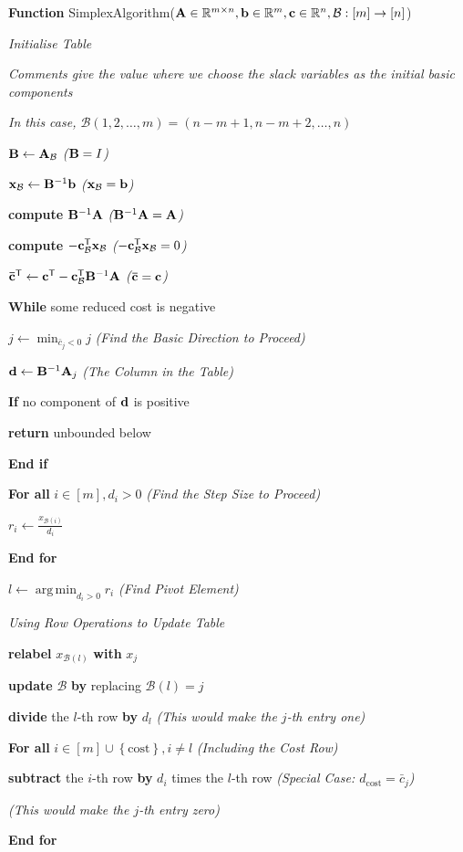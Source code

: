 \documentclass[11pt]{article}
\theoremstyle{definition}
\theoremstyle{remark}
\newcommand{\pqty}[1]{\left(#1\right)}
\newcommand{\bqty}[1]{\left[#1\right]}
\newcommand{\Bqty}[1]{\left\{#1\right\}}
\newcommand{\flatfrac}[2]{\frac{#1}{#2}}
\newcommand{\functiondomain}[3]{#1:#2\to #3}
\newcommand{\RR}{\mathbb{R}}
\newcommand{\transpose}{^{\mathsf{T}}}
\newcommand{\inverse}{^{-1}}
\newcommand{\identityM}{I}
\DeclareMathOperator*{\argmin}{arg\,min}
\newenvironment{algorithmic}{\begin{list}{}{\setlength{\leftmargin}{1em}\setlength{\itemsep}{2pt}}}{\end{list}}
\newcommand{\State}{\item[]}
\newcommand{\Statex}{\item[]}
\newcommand{\Function}[2]{\item[]\textbf{Function }#1(#2)}
\newcommand{\Return}{\textbf{return } }
\newcommand{\ForAll}[1]{\item[]\textbf{For all }#1}
\newcommand{\EndFor}{\item[]\textbf{End for}}
\newcommand{\While}[1]{\item[]\textbf{While }#1}
\newcommand{\If}[1]{\item[]\textbf{If }#1}
\newcommand{\EndIf}{\item[]\textbf{End if}}
\newcommand{\Comment}[1]{\quad\textit{(#1)}}
\newcommand{\LComment}[1]{\Statex\textit{#1}}
\begin{document}
\begin{algorithm}[ht!]
    \caption{Simplex Algorithm}\label{alg:simplex-algorithm}%
    \begin{algorithmic}
        \Function{SimplexAlgorithm}{\(\vb{A} \in \RR^{m \times n}, \vb{b} \in \RR^m, \vb{c} \in \RR^n, \functiondomain{\mathcal{B}}{\bqty{m}}{\bqty{n}}\)}
            \LComment{Initialise Table}
            \LComment{Comments give the value where we choose the slack variables as the initial basic components}
            \LComment{In this case, \(\mathcal{B}\pqty{1, 2, \ldots, m} = \pqty{n - m + 1, n - m + 2, \ldots, n}\)}
            \State \(\vb{B} \gets \vb{A}_{\mathcal{B}}\) \Comment{\(\vb{B} = \identityM\)}
            \State \(\vb{x}_{\mathcal{B}} \gets \vb{B}\inverse\vb{b}\) \Comment{\(\vb{x}_{\mathcal{B}} = \vb{b}\)}
            \State \textbf{compute} \(\vb{B}\inverse \vb{A}\) \Comment{\(\vb{B}\inverse \vb{A} = \vb{A}\)}
            \State \textbf{compute} \(-\vb{c}_{\mathcal{B}}\transpose \vb{x}_{\mathcal{B}}\) \Comment{\(-\vb{c}_{\mathcal{B}}\transpose \vb{x}_{\mathcal{B}} = 0\)}
            \State \(\vb{\bar{c}}\transpose \gets \vb{c}\transpose - \vb{c}_{\mathcal{B}}\transpose \vb{B}\inverse \vb{A}\) \Comment{\(\vb{\bar{c}} = \vb{c}\)}

            \Statex

            \While{some reduced cost is negative}
                \State \(j \gets \min_{\bar{c}_j < 0} j\) \Comment{Find the Basic Direction to Proceed}
                \State \(\vb{d} \gets \vb{B}\inverse \vb{A}_j\) \Comment{The Column in the Table}

                \If{no component of \(\vb d\) is positive}\State \Return{unbounded below}\EndIf
\Statex

                \ForAll{\(i \in \bqty{m}, d_i > 0\)}
                    \Comment{Find the Step Size to Proceed}

                    \State \(r_i \gets \flatfrac{x_{\mathcal{B}\pqty{i}}}{d_i}\)
                \EndFor

                \State \(l \gets \argmin_{d_i > 0} r_i\) \Comment{Find Pivot Element}

                \Statex

                \LComment{Using Row Operations to Update Table}
                \State \textbf{relabel} \(x_{\mathcal{B}\pqty{l}}\) \textbf{with} \(x_j\)
                \State \textbf{update} \(\mathcal{B}\) \textbf{by} replacing \(\mathcal{B}\pqty{l} = j\)
                \State \textbf{divide} the \(l\)-th row \textbf{by} \(d_l\) \Comment{This would make the \(j\)-th entry one}
                \Statex
                \ForAll{\(i \in \bqty{m} \cup \Bqty{\text{cost}}, i \neq l\)}  \Comment{Including the Cost Row}
                    \State \textbf{subtract} the \(i\)-th row \textbf{by} \(d_i\) times the \(l\)-th row \Comment{Special Case: \(d_{\text{cost}} = \bar{c}_{j}\)}
                    \Statex \Comment{This would make the \(j\)-th entry zero}
                \EndFor


\end{algorithmic}
\end{algorithm}
\end{document}
